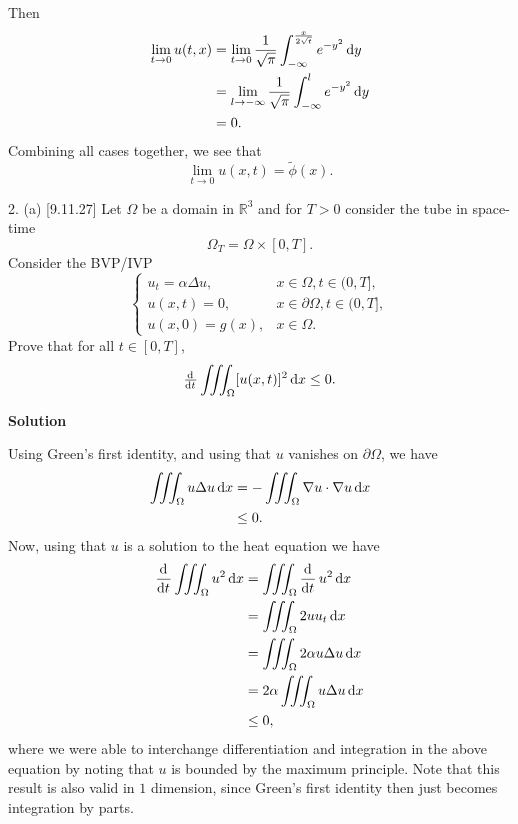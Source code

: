 \documentclass{article}
\begin{document}
Then
%
\begin{align*}
    \lim_{t \to 0} u(t, x)
        &= \lim_{t \to 0} \frac{1}{\sqrt{\pi}} \int_{-\infty}^{\frac{x}{2\sqrt{t}}} e^{-y^2} \dif y \\
        &= \lim_{l \to -\infty} \frac{1}{\sqrt{\pi}} \int_{-\infty}^{l} e^{-y^2} \dif y \\
        &= 0
        .
\end{align*}
%
Combining all cases together, we see that
%
\begin{equation*}
    \lim_{t \to 0} u(x, t) = \widetilde{\phi}(x)
    .
\end{equation*}

\newpage

2. (a) [9.11.27] Let $\Omega$ be a domain in $\mathbb{R}^3$ and for
$T > 0$ consider the tube in space-time
%
\begin{equation*}
    \Omega_T = \Omega \times [0, T]
    .
\end{equation*}
%
Consider the BVP/IVP
%
\begin{equation*}
    \begin{cases}
        u_t = \alpha \Delta u, & x \in \Omega, t \in (0, T], \\
        u(x, t) = 0, & x \in \partial \Omega, t \in (0, T], \\
        u(x, 0) = g(x), & x \in \Omega.
    \end{cases}
\end{equation*}
%
Prove that for all $t \in [0, T]$,
%
\begin{equation*}
    \od{}{t} \iiint_\Omega [u(x, t)]^2 \dif x \leq 0
    .
\end{equation*}

\textbf{Solution}

Using Green's first identity, and using that $u$ vanishes on $\partial
\Omega$, we have
%
\begin{align*}
    \iiint_\Omega u \Delta u \dif x
        &= - \iiint_\Omega \nabla u \cdot \nabla u \dif x \\
        &\leq 0
        .
\end{align*}
%
Now, using that $u$ is a solution to the heat equation we have
%
\begin{align*}
    \dod{}{t} \iiint_\Omega u^2 \dif x
        &= \iiint_\Omega \dod{}{t} u^2 \dif x \\
        &= \iiint_\Omega 2 u u_t \dif x \\
        &= \iiint_\Omega 2 \alpha  u \Delta u \dif x \\
        &= 2 \alpha \iiint_\Omega u \Delta u \dif x \\
        &\leq 0
        ,
\end{align*}
%
where we were able to interchange differentiation and integration in the
above equation by noting that $u$ is bounded by the maximum principle.
Note that this result is also valid in $1$ dimension, since Green's
first identity then just becomes integration by parts.
\end{document}
